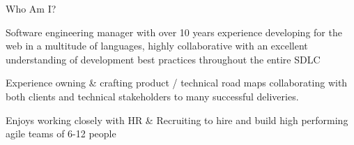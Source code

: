 \documentclass[9pt]{developercv} %
\begin{document}
\vspace{0.5cm}

\begin{cvsect}{Who Am I?}

  \begin{minipage}[t]{0.5\textwidth} %
    \vspace{-\baselineskip} %
  Software engineering manager with over 10 years experience developing for the web in a multitude of languages, highly collaborative with an excellent understanding of development best practices throughout the entire SDLC

  Experience owning \& crafting product / technical road maps collaborating with both clients and technical stakeholders to many successful deliveries.

  Enjoys working closely with HR \& Recruiting to hire and build high performing agile teams of 6-12 people
  \end{minipage}
  \hfill %
  \begin{minipage}[t]{0.4\textwidth} %
    \vspace{-\baselineskip} %
    \begin{barchart}{5.5}
    \end{barchart}
  \end{minipage}
\end{cvsect}


\end{document}
